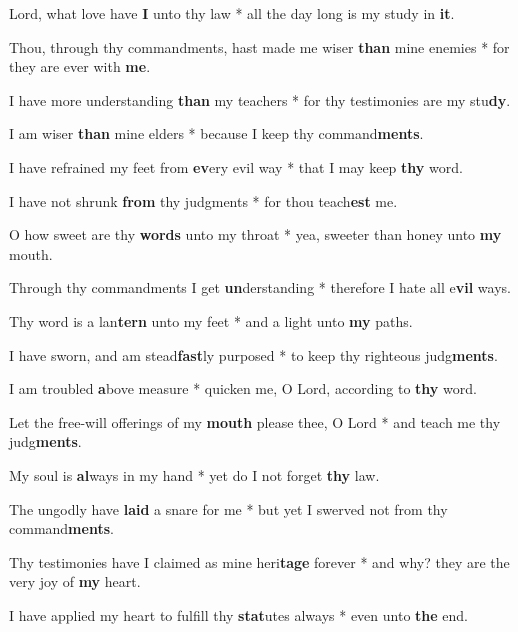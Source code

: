 \begin{multicols}{2}
	Lord, what love have \textbf{I} unto thy law * all the day long is my study in \textbf{it}.
	
	Thou, through thy commandments, hast made me wiser \textbf{than} mine enemies * for they are ever with \textbf{me}.
	
	I have more understanding \textbf{than} my teachers * for thy testimonies are my stu\textbf{dy}.
	
	I am wiser \textbf{than} mine elders * because I keep thy command\textbf{ments}.
	
	I have refrained my feet from \textbf{ev}ery evil way * that I may keep \textbf{thy} word.
	
	I have not shrunk \textbf{from} thy judgments * for thou teach\textbf{est} me.
	
	O how sweet are thy \textbf{words} unto my throat * yea, sweeter than honey unto \textbf{my} mouth.
	
	Through thy commandments I get \textbf{un}derstanding * therefore I hate all e\textbf{vil} ways.
	
	Thy word is a lan\textbf{tern} unto my feet * and a light unto \textbf{my} paths.
	
	I have sworn, and am stead\textbf{fast}ly purposed * to keep thy righteous judg\textbf{ments}.
	
	I am troubled \textbf{a}bove measure * quicken me, O Lord, according to \textbf{thy} word.
	
	Let the free-will offerings of my \textbf{mouth} please thee, O Lord * and teach me thy judg\textbf{ments}.
	
	My soul is \textbf{al}ways in my hand * yet do I not forget \textbf{thy} law.
	
	The ungodly have \textbf{laid} a snare for me * but yet I swerved not from thy command\textbf{ments}.
	
	Thy testimonies have I claimed as mine heri\textbf{tage} forever * and why? they are the very joy of \textbf{my} heart.
	
	I have applied my heart to fulfill thy \textbf{stat}utes always * even unto \textbf{the} end.
\end{multicols}